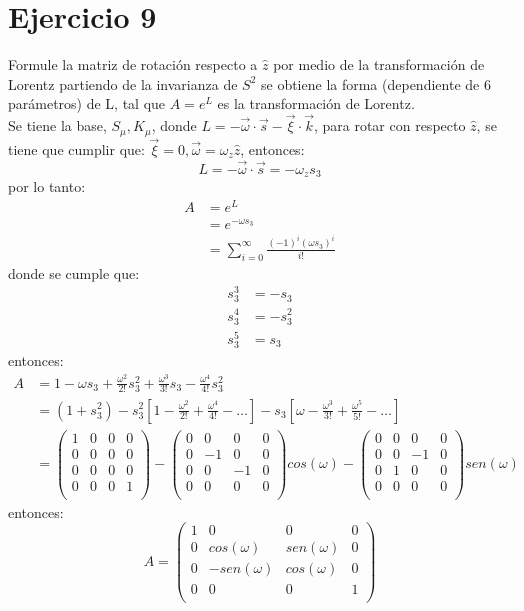 \section*{Ejercicio 9}
Formule la matriz de rotación respecto a $\hat{z}$ por medio de la transformación de Lorentz partiendo de la invarianza de $S^2$ se obtiene la 
forma (dependiente de 6 parámetros) de L, tal que $A=e^L$ es la transformación de Lorentz.\\
Se tiene la base, $S_\mu , K_\mu$, donde $L=-\vec{\omega}\cdot \vec{s}- \vec{\xi}\cdot \vec{k}$, para rotar con respecto $\hat{z}$, se tiene que cumplir que:
$\vec{\xi}=0 , \vec{\omega}=\omega_z \hat{z}$, entonces:
\begin{equation*}
    L=-\vec{\omega}\cdot \vec{s}=-\omega_z s_3
\end{equation*}
por lo tanto:
\begin{align*}
    A&=e^L \\
    &=e^{-\omega s_3}\\
    &=\sum_{i=0}^\infty \frac{(-1)^i(\omega s_3)^i}{i!} 
\end{align*}
donde se cumple que: 
\begin{align*}
    s^3_3&=-s_3\\
s^4_3&=-s_3^2\\
s_3^5&=s_3
\end{align*}
entonces:
\begin{align*}
    A&=1-\omega s_3 + \frac{\omega^2}{2!}s_3^2 + \frac{\omega^3}{3!}s_3 - \frac{\omega^4}{4!}s_3^2\\
    &=(1+s_3^2)-s_3^2\left[1-\frac{\omega^2}{2!}+\frac{\omega^4}{4!}-\dots \right] - s_3 \left[\omega - \frac{\omega^3}{3!}+\frac{\omega^5}{5!}-\dots \right]\\
    &= \left(\begin{matrix}
        1 & 0 & 0 & 0 \\
        0 & 0 & 0 & 0 \\
        0 & 0 & 0 & 0 \\
        0 & 0 & 0 & 1 \\
    \end{matrix}\right) - \left(\begin{matrix}
        0 & 0 & 0 & 0 \\
        0 &-1 & 0 & 0 \\
        0 & 0 & -1 & 0 \\
        0 & 0 & 0 & 0 \\
    \end{matrix}\right) cos(\omega) - \left(\begin{matrix}
        0 & 0 & 0 & 0 \\
        0 & 0 & -1 & 0 \\
        0 & 1 & 0 & 0 \\
        0 & 0 & 0 & 0 \\
    \end{matrix}\right) sen(\omega)
\end{align*}
entonces:
\begin{equation*}
    A=\left(\begin{matrix}
        1 & 0 & 0 & 0 \\
        0 & cos(\omega) & sen(\omega) & 0 \\
        0 & -sen(\omega) & cos(\omega) & 0 \\
        0 & 0 & 0 & 1 \\
    \end{matrix}\right) 
\end{equation*}